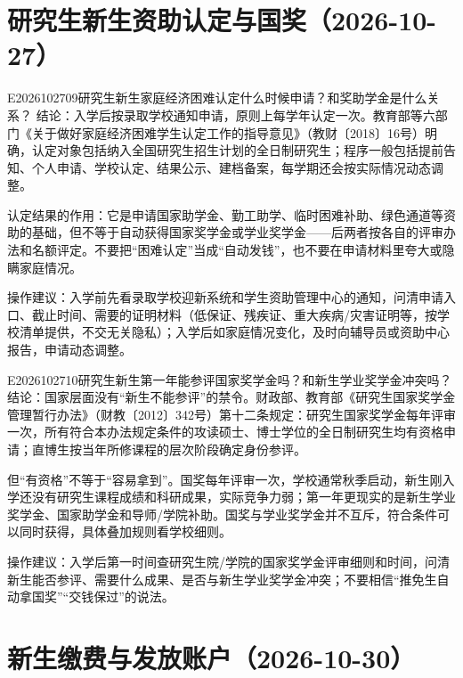 \section{研究生新生资助认定与国奖（2026-10-27）}
\begin{qa}{E2026102709}{研究生新生家庭经济困难认定什么时候申请？和奖助学金是什么关系？}
结论：入学后按录取学校通知申请，原则上每学年认定一次。教育部等六部门《关于做好家庭经济困难学生认定工作的指导意见》（教财〔2018〕16号）明确，认定对象包括纳入全国研究生招生计划的全日制研究生；程序一般包括提前告知、个人申请、学校认定、结果公示、建档备案，每学期还会按实际情况动态调整。

认定结果的作用：它是申请国家助学金、勤工助学、临时困难补助、绿色通道等资助的基础，但不等于自动获得国家奖学金或学业奖学金——后两者按各自的评审办法和名额评定。不要把“困难认定”当成“自动发钱”，也不要在申请材料里夸大或隐瞒家庭情况。

操作建议：入学前先看录取学校迎新系统和学生资助管理中心的通知，问清申请入口、截止时间、需要的证明材料（低保证、残疾证、重大疾病/灾害证明等，按学校清单提供，不交无关隐私）；入学后如家庭情况变化，及时向辅导员或资助中心报告，申请动态调整。
\end{qa}


\begin{qa}{E2026102710}{研究生新生第一年能参评国家奖学金吗？和新生学业奖学金冲突吗？}
结论：国家层面没有“新生不能参评”的禁令。财政部、教育部《研究生国家奖学金管理暂行办法》（财教〔2012〕342号）第十二条规定：研究生国家奖学金每年评审一次，所有符合本办法规定条件的攻读硕士、博士学位的全日制研究生均有资格申请；直博生按当年所修课程的层次阶段确定身份参评。

但“有资格”不等于“容易拿到”。国奖每年评审一次，学校通常秋季启动，新生刚入学还没有研究生课程成绩和科研成果，实际竞争力弱；第一年更现实的是新生学业奖学金、国家助学金和导师/学院补助。国奖与学业奖学金并不互斥，符合条件可以同时获得，具体叠加规则看学校细则。

操作建议：入学后第一时间查研究生院/学院的国家奖学金评审细则和时间，问清新生能否参评、需要什么成果、是否与新生学业奖学金冲突；不要相信“推免生自动拿国奖”“交钱保过”的说法。
\end{qa}

\section{新生缴费与发放账户（2026-10-30）}

